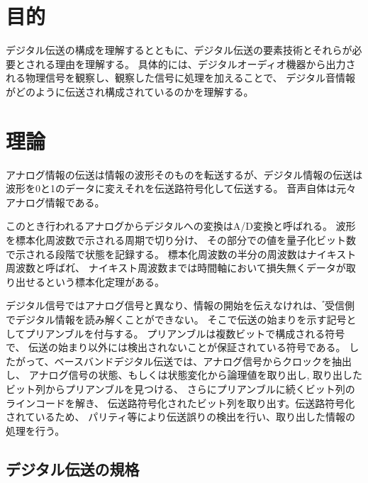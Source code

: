 \documentclass[11pt,a4j]{jsarticle}
\begin{document}


\section{目的}
デジタル伝送の構成を理解するとともに、デジタル伝送の要素技術とそれらが必要とされる理由を理解する。
具体的には、デジタルオーディオ機器から出力される物理信号を観察し、観察した信号に処理を加えることで、
デジタル音情報がどのように伝送され構成されているのかを理解する。


\section{理論}
\label{sec:理論}

アナログ情報の伝送は情報の波形そのものを転送するが、デジタル情報の伝送は
波形を0と1のデータに変えそれを伝送路符号化して伝送する。
音声自体は元々アナログ情報である。

このとき行われるアナログからデジタルへの変換はA/D変換と呼ばれる。
波形を標本化周波数で示される周期で切り分け、
その部分での値を量子化ビット数で示される段階で状態を記録する。
標本化周波数の半分の周波数はナイキスト周波数と呼ばれ゙、
ナイキスト周波数までは時間軸において損失無くデータが取り出せるという標本化定理がある。

デジタル信号ではアナログ信号と異なり、情報の開始を伝えなけれは、
゙受信側でデジタル情報を読み解くことができない。
そこで伝送の始まりを示す記号としてプリアンブルを付与する。
プリアンブルは複数ビットで構成される符号で、
伝送の始まり以外には検出されないことが保証されている符号である。
したがって、ベースバンドデジタル伝送では、アナログ信号からクロックを抽出し、
アナログ信号の状態、もしくは状態変化から論理値を取り出し,
取り出したビット列からプリアンブルを見つける、
さらにプリアンブルに続くビット列のラインコードを解き、
伝送路符号化されたビット列を取り出す。伝送路符号化されているため、
パリティ等により伝送誤りの検出を行い、取り出した情報の処理を行う。

\subsection{デジタル伝送の規格}
\label{sub:デジタル伝送の規格}
\end{document}
